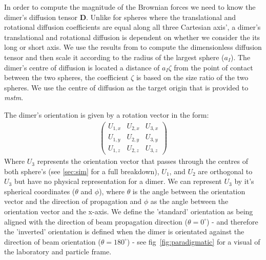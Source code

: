 In order to compute the magnitude of the Brownian forces we
need to know the dimer's diffusion tensor \textbf{D}. Unlike
for spheres where the translational and rotational diffusion 
coefficients are equal along all three Cartesian axis', a
dimer's translational and rotational diffusion is dependent
on whether we consider the its long or short axis. We use
the results from \cite{Nir1973} to compute the dimensionless 
diffusion tensor and then scale it according to the radius of
the largest sphere ($a_I$). The dimer's centre of diffusion
is located a distance of $a_I\zeta$ from the point of contact
between the two spheres, the coefficient $\zeta$ is based on
the size ratio of the two spheres. We use the centre of 
diffusion as the target origin that is provided to \textit{mstm}. 

The dimer's orientation is given by a rotation vector in 
the form: 
\begin{align}
	\begin{pmatrix}
		U_{1,x} & U_{2,x} & U_{3,x} \\
		U_{1,y} & U_{2,y} & U_{3,y} \\
		U_{1,z} & U_{2,z} & U_{3,z}
	\end{pmatrix}
\end{align}
Where $U_3$ represents the orientation vector that passes
through the centres of both sphere's (see \ref{sec:sim} 
for a full breakdown), $U_1$, and $U_2$ are orthogonal to 
$U_3$ but have no physical representation for a dimer. We 
can represent $U_3$ by it's spherical coordinates ($\theta$ 
and $\phi$), where $\theta$ is the angle between the 
orientation vector and the direction of propagation and 
$\phi$ as the angle between the orientation vector and 
the x-axis. We define the 'standard' orientation as 
being aligned with the direction of beam propagation 
direction ($\theta=0^\circ$) - and therefore the 'inverted' 
orientation is defined when the dimer is orientated against 
the direction of beam orientation ($\theta=180^\circ$) - see
fig~\ref{fig:paradigmatic} for a visual of the laboratory and
particle frame. 

